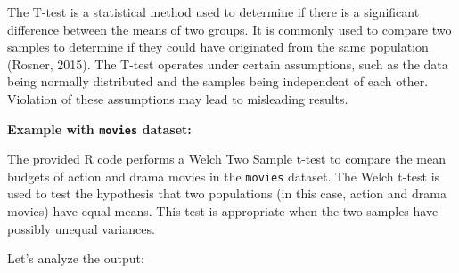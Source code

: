 \documentclass[
]{book}
\newenvironment{Shaded}{\begin{snugshade}}{\end{snugshade}}
\newcommand{\CommentTok}[1]{\textcolor[rgb]{0.56,0.35,0.01}{\textit{#1}}}
\newcommand{\FunctionTok}[1]{\textcolor[rgb]{0.13,0.29,0.53}{\textbf{#1}}}
\newcommand{\NormalTok}[1]{#1}
\newcommand{\OtherTok}[1]{\textcolor[rgb]{0.56,0.35,0.01}{#1}}
\newcommand{\SpecialCharTok}[1]{\textcolor[rgb]{0.81,0.36,0.00}{\textbf{#1}}}
\newcommand{\StringTok}[1]{\textcolor[rgb]{0.31,0.60,0.02}{#1}}
\begin{document}
The T-test is a statistical method used to determine if there is a significant difference between the means of two groups. It is commonly used to compare two samples to determine if they could have originated from the same population (Rosner, 2015). The T-test operates under certain assumptions, such as the data being normally distributed and the samples being independent of each other. Violation of these assumptions may lead to misleading results.

\textbf{Example with \texttt{movies} dataset:}

The provided R code performs a Welch Two Sample t-test to compare the mean budgets of action and drama movies in the \texttt{movies} dataset. The Welch t-test is used to test the hypothesis that two populations (in this case, action and drama movies) have equal means. This test is appropriate when the two samples have possibly unequal variances.

\begin{Shaded}
\end{Shaded}

Let's analyze the output:
\end{document}
